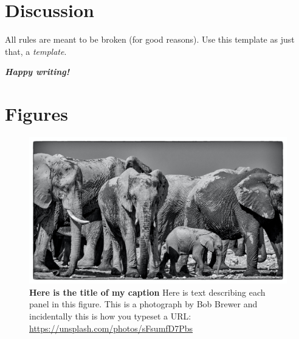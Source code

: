 \documentclass{getwriting}
\begin{document}
\section{Discussion}
All rules are meant to be broken (for good reasons). Use this template as just that, a \textit{template}. 
\par
\begin{center}
    \Large{\textit{\textbf{Happy writing!}}}
\end{center}
\newpage
\section{Figures}\label{figures}
\begin{figure}[H]
\label{fig:figure1}
\includegraphics[width=5.25in]{testPicture.jpg}
\caption{\textbf{Here is the title of my caption} Here is text describing each panel in this figure. This is a photograph by Bob Brewer and incidentally this is how you typeset a URL: \url{https://unsplash.com/photos/sFsumfD7Pbs}}
\end{figure}
\newpage
\end{document}
